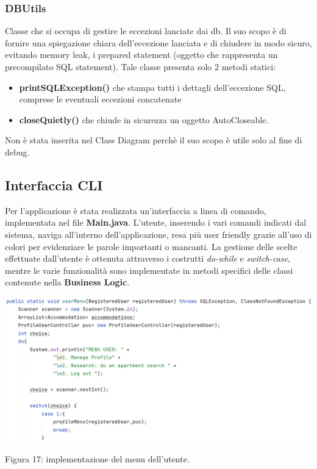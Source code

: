 \documentclass[10pt]{article}
\begin{document}
\subsubsection{DBUtils}
Classe che si occupa di gestire le eccezioni lanciate dai db. Il suo scopo \`e di fornire una spiegazione chiara dell'eccezione lanciata e di chiudere in modo sicuro, evitando memory leak, i prepared statement (oggetto che rappresenta un precompilato SQL statement). Tale classe presenta solo 2 metodi statici:
\begin{itemize}
    \item \textbf{printSQLException()} che stampa tutti i dettagli dell'eccezione SQL, comprese le eventuali eccezioni concatenate  
    \item \textbf{closeQuietly()} che chiude in sicurezza un oggetto AutoCloseable.
\end{itemize}
Non \`e stata inserita nel Class Diagram perch\`e il suo scopo \`e utile solo al fine di debug.

\subsection{Interfaccia CLI}

Per l'applicazione \`e stata realizzata un'interfaccia a linea di comando, implementata nel file \textbf{Main.java}. L'utente, inserendo i vari comandi indicati dal sistema, naviga all'interno dell'applicazione, resa pi\`u user friendly grazie all'uso di colori per evidenziare le parole importanti o mancanti. La gestione delle scelte effettuate dall'utente \`e ottenuta attraverso i costrutti \textit{do-while} e \textit{switch-case}, mentre le varie funzionalit\`a sono implementate in metodi specifici delle classi contenute nella \textbf{Business Logic}.

\begin{center}
\hspace*{-0.75cm}
\includegraphics[scale=0.6]{cli/usermenu}
\par\medskip
Figura 17: implementazione del menu dell'utente.
\par\medskip
\end{center} 
\end{document}
